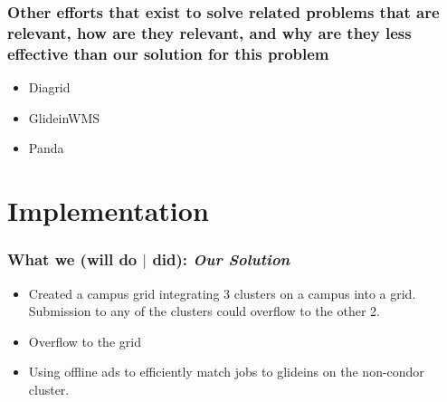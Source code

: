 \documentclass[11pt]{article}
\begin{document}
\subsubsection*{Other efforts that exist to solve related problems that are
relevant, how are they relevant, and why are they less effective than our
solution for this problem}

\begin{itemize}

\item
Diagrid

\item 
GlideinWMS

\item
Panda


\end{itemize}

\section{Implementation}
\label{sec:Implementation}

\subsubsection*{What we (will do $|$ did): {\em Our Solution}}
\begin{itemize}



\item
Created a campus grid integrating 3 clusters on a campus into a grid.  Submission to any of the clusters could overflow to the other 2.

\item
Overflow to the grid

\item
Using offline ads to efficiently match jobs to glideins on the non-condor cluster.

\end{itemize}
\end{document}
